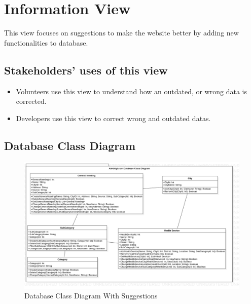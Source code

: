 \section{Information View}
This view focuses on suggestions to make the website better by adding new functionalities to database.

\subsection{Stakeholders' uses of this view}
\begin{itemize}
    \item Volunteers use this view to understand how an outdated, or wrong data is corrected.
    \item Developers use this view to correct wrong and outdated datas.
\end{itemize}

\subsection{Database Class Diagram}
\begin{figure}[H]
    \includegraphics[scale = 0.4]{assets/ClassDiagram2.png}
    \caption[Database Class Diagram With Suggestions]{Database Class Diagram With Suggestions}
\end{figure}

